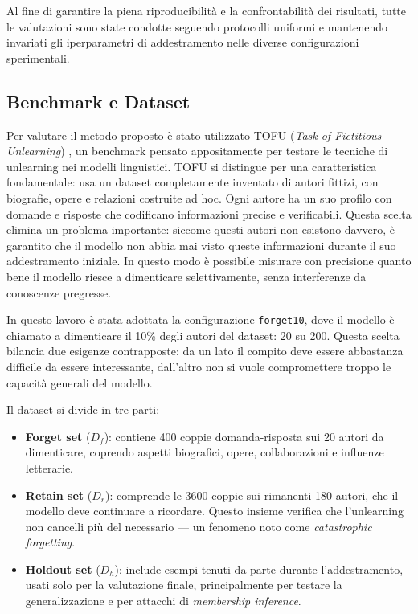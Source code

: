 Al fine di garantire la piena riproducibilità e la confrontabilità dei risultati, tutte le valutazioni sono state condotte seguendo protocolli uniformi e mantenendo invariati gli iperparametri di addestramento nelle diverse configurazioni sperimentali.

\subsection{Benchmark e Dataset}

Per valutare il metodo proposto è stato utilizzato TOFU (\emph{Task of Fictitious Unlearning}) \cite{maini2024tofu}, un benchmark pensato appositamente per testare le tecniche di unlearning nei modelli linguistici. TOFU si distingue per una caratteristica fondamentale: usa un dataset completamente inventato di autori fittizi, con biografie, opere e relazioni costruite ad hoc. Ogni autore ha un suo profilo con domande e risposte che codificano informazioni precise e verificabili. Questa scelta elimina un problema importante: siccome questi autori non esistono davvero, è garantito che il modello non abbia mai visto queste informazioni durante il suo addestramento iniziale. In questo modo è possibile misurare con precisione quanto bene il modello riesce a dimenticare selettivamente, senza interferenze da conoscenze pregresse.

In questo lavoro è stata adottata la configurazione \texttt{forget10}, dove il modello è chiamato a dimenticare il 10\% degli autori del dataset: 20 su 200. Questa scelta bilancia due esigenze contrapposte: da un lato il compito deve essere abbastanza difficile da essere interessante, dall'altro non si vuole compromettere troppo le capacità generali del modello.

Il dataset si divide in tre parti:

\begin{itemize}
    \item \textbf{Forget set} ($D_f$): contiene 400 coppie domanda-risposta sui 20 autori da dimenticare, coprendo aspetti biografici, opere, collaborazioni e influenze letterarie.
    
    \item \textbf{Retain set} ($D_r$): comprende le 3600 coppie sui rimanenti 180 autori, che il modello deve continuare a ricordare. Questo insieme verifica che l'unlearning non cancelli più del necessario --- un fenomeno noto come \emph{catastrophic forgetting}.
    
    \item \textbf{Holdout set} ($D_h$): include esempi tenuti da parte durante l'addestramento, usati solo per la valutazione finale, principalmente per testare la generalizzazione e per attacchi di \emph{membership inference}.
\end{itemize}

